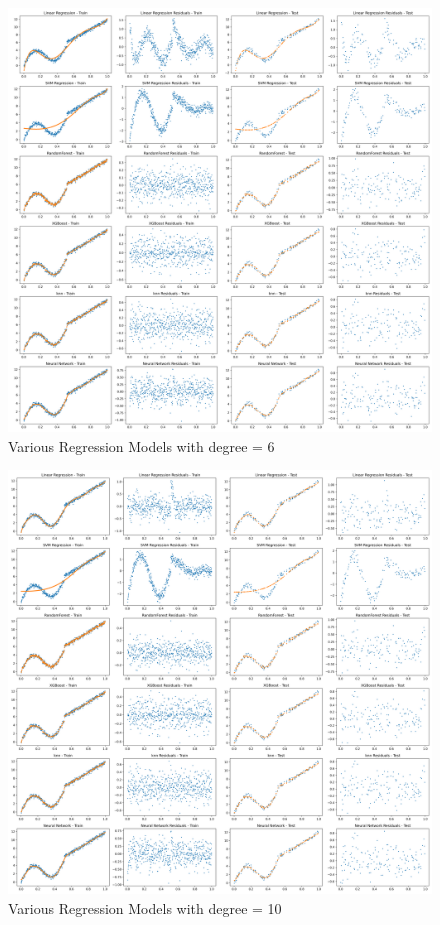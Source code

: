 \begin{figure}[H]
	\centering
	\includegraphics[width=\linewidth]{./Images/E3-MLR3-6.png}
	\caption{Various Regression Models with degree = 6}
\end{figure}

\begin{figure}[H]
	\centering
	\includegraphics[width=1\linewidth]{./Images/E3-MLR3-10.png}
	\caption{Various Regression Models with degree = 10}
\end{figure}

